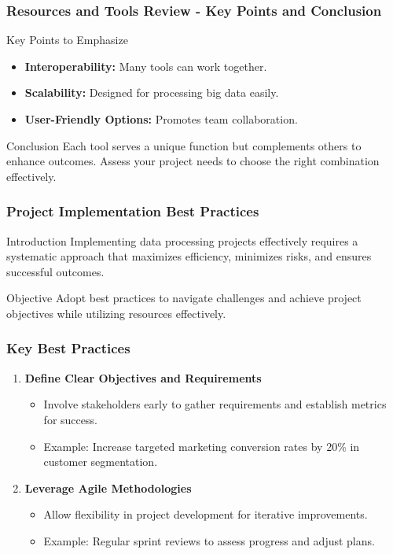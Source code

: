 \documentclass{beamer}
\begin{document}
\begin{frame}[fragile]
    \frametitle{Resources and Tools Review - Key Points and Conclusion}
    \begin{block}{Key Points to Emphasize}
        \begin{itemize}
            \item \textbf{Interoperability:} Many tools can work together.
            \item \textbf{Scalability:} Designed for processing big data easily.
            \item \textbf{User-Friendly Options:} Promotes team collaboration.
        \end{itemize}
    \end{block}

    \begin{block}{Conclusion}
        Each tool serves a unique function but complements others to enhance outcomes. Assess your project needs to choose the right combination effectively.
    \end{block}
\end{frame}

\begin{frame}[fragile]
    \frametitle{Project Implementation Best Practices}
    \begin{block}{Introduction}
        Implementing data processing projects effectively requires a systematic approach that maximizes efficiency, minimizes risks, and ensures successful outcomes.
    \end{block}
    \begin{block}{Objective}
        Adopt best practices to navigate challenges and achieve project objectives while utilizing resources effectively.
    \end{block}
\end{frame}

\begin{frame}[fragile]
    \frametitle{Key Best Practices}
    \begin{enumerate}
        \item \textbf{Define Clear Objectives and Requirements}
            \begin{itemize}
                \item Involve stakeholders early to gather requirements and establish metrics for success.
                \item Example: Increase targeted marketing conversion rates by 20\% in customer segmentation.
            \end{itemize}
            
        \item \textbf{Leverage Agile Methodologies}
            \begin{itemize}
                \item Allow flexibility in project development for iterative improvements.
                \item Example: Regular sprint reviews to assess progress and adjust plans.
            \end{itemize}
    \end{enumerate}
\end{frame}
\end{document}

